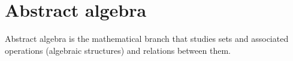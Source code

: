 \section{Abstract algebra}
    Abstract algebra \cite{joyce2008} is the mathematical branch that studies sets and associated operations (algebraic structures) and relations between them.

    

    

    

    

    

    
